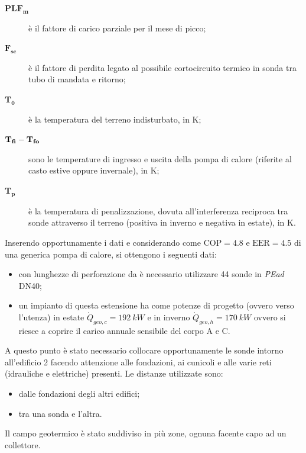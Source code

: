 \begin{description}
	\item[$\mathbf{PLF_m}$] è il fattore di carico parziale per il mese di picco;
	\item[$\mathbf{F_{sc}}$] è il fattore di perdita legato al possibile cortocircuito termico in sonda tra tubo di mandata e ritorno;
	\item[$\mathbf{T_0}$] è la temperatura del terreno indisturbato, in \si{K};
	\item[$\mathbf{T_{fi}} \-- \mathbf{T_{fo}}$] sono le temperature di ingresso e uscita della pompa di calore (riferite al casto estive oppure invernale), in \si{K};
	\item[$\mathbf{T_p}$] è la temperatura di penalizzazione, dovuta all'interferenza reciproca tra sonde attraverso il terreno (positiva in inverno e negativa in estate), in \si{K}.
\end{description}
Inserendo opportunamente i dati e considerando come $\mathrm{COP}=\num{4.8}$ e $\mathrm{EER}=\num{4.5}$ di una generica pompa di calore, si ottengono i seguenti dati:
\begin{itemize}
	\item con lunghezze di perforazione da  è necessario utilizzare \num{44} sonde in \emph{PEad} DN40;
	\item un impianto di questa estensione ha come potenze di progetto (ovvero verso l'utenza) in estate $\dot{Q}_{geo,c}=\SI{192}{kW}$ e in inverno $\dot{Q}_{geo,h}=\SI{170}{kW}$ ovvero si riesce a coprire il carico annuale sensibile del corpo A e C.
\end{itemize}
A questo punto è stato necessario collocare opportunamente le sonde intorno all'edificio 2 facendo attenzione alle fondazioni, ai cunicoli e alle varie reti (idrauliche e elettriche) presenti. Le distanze utilizzate sono:
\begin{itemize}
	\item {} dalle fondazioni degli altri edifici;
	\item {} tra una sonda e l'altra.
\end{itemize}
Il campo geotermico è stato suddiviso in più zone, ognuna facente capo ad un collettore. 


